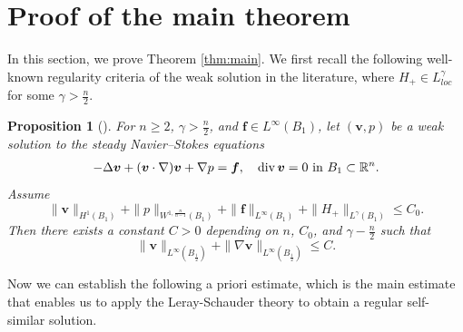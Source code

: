 \documentclass[12pt]{amsart}
\newtheorem{pro}[theorem]{Proposition}
\renewcommand{\div}{{\rm div \thinspace }}
\newcommand{\Bv}{{\boldsymbol{v}}}
\newcommand{\Bf}{{\boldsymbol{f}}}
\begin{document}
\section{Proof of the main theorem} \label{sec:proof of main}
In this section, we prove  Theorem \ref{thm:main}.
We first recall the following well-known regularity criteria of the weak solution in the literature, where $H_+\in L_{loc}^{\gamma}$ for some $\gamma>\frac{n}{2}$.
\begin{pro}[]\label{lem:keylemma}
	For $n\geq 2$, $\gamma >\frac{n}{2}$, and $\Bf\in L^{\infty}(B_1)$, let $(\Bv, p)$ be a weak solution to the steady Navier–Stokes equations
	\begin{align} \label{NS1}
		-\Delta \Bv + (\Bv\cdot \nabla )\Bv + \nabla p=\boldsymbol {f}, \quad \div \Bv=0 \textrm{ in } B_1\subset \mathbb{R}^n.
	\end{align}
	Assume
	\begin{equation*}
		\|\Bv\|_{H^1(B_1)} +\|p\|_{W^{1,\frac{n}{n-1}}(B_1)} + \|\Bf\|_{L^{\infty}(B_1)} + \|H_+\|_{L^{\gamma}(B_1)} \leq C_0.
	\end{equation*}
	Then there exists a constant $C>0$ depending on $n$, $C_0$, and  $\gamma -\frac{ n}{2}$ such that
	\begin{equation*}
		\|\Bv\|_{L^{\infty}(B_{\frac{1}{2}})} + 	\|\nabla\Bv\|_{L^{\infty}(B_{\frac{1}{2}})} \leq C.
	\end{equation*}
\end{pro}

Now we can establish the following a priori estimate, which is the main estimate that enables us to apply the Leray-Schauder theory to obtain a regular self-similar solution.
\end{document}
